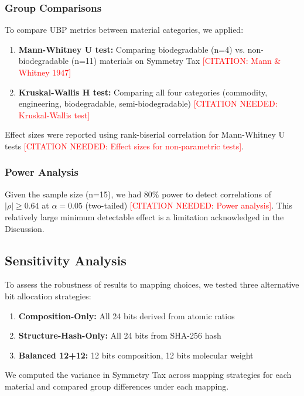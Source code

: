 \documentclass[11pt,letterpaper]{article}
\begin{document}
\subsubsection{Group Comparisons}
To compare UBP metrics between material categories, we applied:

\begin{enumerate}
    \item \textbf{Mann-Whitney U test:} Comparing biodegradable (n=4) vs. non-biodegradable (n=11) materials on Symmetry Tax \textcolor{red}{[CITATION: Mann \& Whitney 1947]}
    \item \textbf{Kruskal-Wallis H test:} Comparing all four categories (commodity, engineering, biodegradable, semi-biodegradable) \textcolor{red}{[CITATION NEEDED: Kruskal-Wallis test]}
\end{enumerate}

Effect sizes were reported using rank-biserial correlation for Mann-Whitney U tests \textcolor{red}{[CITATION NEEDED: Effect sizes for non-parametric tests]}.

\subsubsection{Power Analysis}
Given the sample size (n=15), we had 80\% power to detect correlations of $|\rho| \geq 0.64$ at $\alpha=0.05$ (two-tailed) \textcolor{red}{[CITATION NEEDED: Power analysis]}. This relatively large minimum detectable effect is a limitation acknowledged in the Discussion.

\subsection{Sensitivity Analysis}

To assess the robustness of results to mapping choices, we tested three alternative bit allocation strategies:

\begin{enumerate}
    \item \textbf{Composition-Only:} All 24 bits derived from atomic ratios
    \item \textbf{Structure-Hash-Only:} All 24 bits from SHA-256 hash
    \item \textbf{Balanced 12+12:} 12 bits composition, 12 bits molecular weight
\end{enumerate}

We computed the variance in Symmetry Tax across mapping strategies for each material and compared group differences under each mapping.
\end{document}
